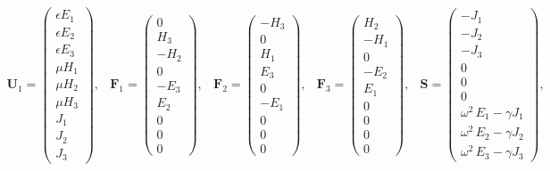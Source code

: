 \begin{equation*}
\begin{array}{ccccc}
\mathbf{U}_1 = \begin{pmatrix} \epsilon E_1 \\ \epsilon E_2 \\ \epsilon E_3 \\ \mu H_1 \\ \mu H_2 \\  \mu H_3 \\ J_1 \\  J_2 \\ J_3 \end{pmatrix} ,
&
\mathbf{F}_1 = \begin{pmatrix} 0 \\ H_3 \\ -H_2 \\ 0 \\ -E_3 \\ E_2 \\ 0 \\  0 \\ 0 \end{pmatrix} ,
&
\mathbf{F}_2 = \begin{pmatrix} - H_3 \\ 0 \\ H_1 \\ E_3 \\ 0 \\ -E_1 \\ 0 \\  0 \\ 0 \end{pmatrix} ,
&
\mathbf{F}_3 = \begin{pmatrix} H_2 \\ -H_1 \\ 0 \\ -E_2 \\ E_1 \\ 0 \\ 0 \\  0 \\ 0 \end{pmatrix} ,
&
\mathbf{S} = \begin{pmatrix} - J_1 \\ - J_2 \\ - J_3 \\ 0 \\ 0 \\ 0 \\ \omega^2 \, E_1 - \gamma J_1 \\  \omega^2 \, E_2 - \gamma J_2 \\ \omega^2 \, E_3 - \gamma J_3 \end{pmatrix} ,
\end{array}
\:
\end{equation*}


